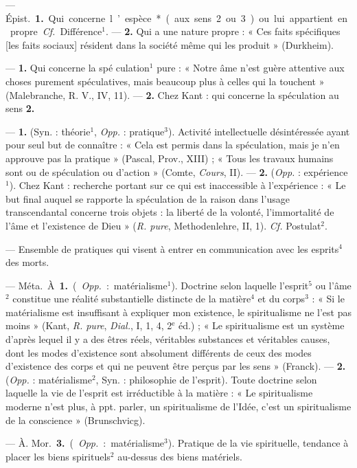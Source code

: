 \begin{itemize}[leftmargin=1cm, label=, itemsep=1pt]
 — \si{Épist.} {\bf 1.} Qui concerne
l’espèce* (aux sens 2 ou 3) ou lui
appartient en propre. {\it Cf.} Différence$^1$. — {\bf 2.} Qui a une nature
propre : « Ces faits spécifiques [les
faits sociaux] résident dans la société même qui les produit » (Durkheim).

 — {\bf 1.} Qui concerne la spé
culation$^1$ pure : « Notre âme n'est
guère attentive aux choses purement spéculatives, mais beaucoup
plus à celles qui la touchent » (Malebranche, R. V., IV, 11). — {\bf 2.} Chez
Kant : qui concerne la spéculation
au sens {\bf 2.}

 — {\bf 1.} (Syn. : théorie$^1$, {\it Opp.} :
pratique$^3$). Activité intellectuelle désintéressée ayant pour seul but de
connaître : « Cela est permis dans la
spéculation, mais je n’en approuve
pas la pratique » (Pascal, Prov.,
XIII) ; « Tous les travaux humains
sont ou de spéculation ou d'action »
(Comte, {\it Cours}, II). — {\bf 2.} ({\it Opp.} :
expérience$^1$). Chez Kant : recherche
portant sur ce qui est inaccessible à
l'expérience : « Le but final auquel
se rapporte la spéculation de la
raison dans l’usage transcendantal
concerne trois objets : la liberté de
la volonté, l’immortalité de l'âme
et l'existence de Dieu » ({\it R. pure},
Methodenlehre, II, 1). {\it Cf.} Postulat$^2$.

 — Ensemble de pratiques
qui visent à entrer en communication avec les esprits$^4$ des
morts.

 — \si{Méta.} À. {\bf 1.} ({\it Opp.} :
matérialisme$^1$). Doctrine selon laquelle l'esprit$^5$ ou l'âme$^2$ constitue
une réalité substantielle distincte
de la matière$^4$ et du corps$^3$ : « Si le
matérialisme est insuffisant à expliquer mon existence, le spiritualisme ne l’est pas moins » (Kant,
{\it R. pure}, {\it Dial.}, I, 1, 4, 2$^\text{e}$ éd.) ; « Le
spiritualisme est un système d’après
lequel il y a des êtres réels, véritables
substances et véritables causes,
dont les modes d’existence sont
absolument différents de ceux des
modes d'existence des corps et qui
ne peuvent être perçus par les sens »
(Franck). — {\bf 2.} ({\it Opp.} : matérialisme$^2$, Syn. : philosophie de l'esprit).
Toute doctrine selon laquelle la vie
de l'esprit est irréductible à la matière : « Le spiritualisme moderne
n’est plus, à ppt. parler, un spiritualisme de l’Idée, c’est un spiritualisme de la conscience » (Brunschvicg).

— À. \si{Mor.} {\bf 3.} ({\it Opp.} : matérialisme$^3$). Pratique de la vie spirituelle, tendance à placer les biens
spirituels$^2$ au-dessus des biens matériels.


\end{itemize}
